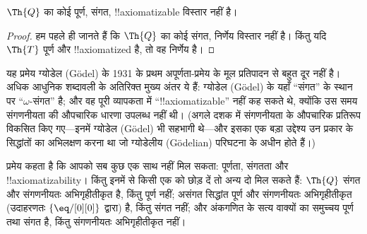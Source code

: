 \documentclass[../../../include/open-logic-section]{subfiles}
\begin{document}


\begin{thm}
$\Th{Q}$ का कोई पूर्ण, संगत, !!{axiomatizable} विस्तार नहीं है।
\end{thm}

\begin{proof}
हम पहले ही जानते हैं कि $\Th{Q}$ का कोई संगत, निर्णेय विस्तार नहीं है।
किंतु यदि $\Th{T}$ पूर्ण और !!{axiomatized} है, तो वह निर्णेय है।
\end{proof}

\begin{explain}
यह प्रमेय ग्योडेल (G\"odel) के 1931 के प्रथम अपूर्णता-प्रमेय के मूल
प्रतिपादन से बहुत दूर नहीं है। अधिक आधुनिक शब्दावली के अतिरिक्त मुख्य
अंतर ये हैं: ग्योडेल (G\"odel) के यहाँ ``संगत'' के स्थान पर ``$\omega$-संगत'' है;
और वह पूरी व्यापकता में ``!!{axiomatizable}'' नहीं कह सकते थे, क्योंकि उस
समय संगणनीयता की औपचारिक धारणा उपलब्ध नहीं थी। (अगले दशक में संगणनीयता के
औपचारिक प्रतिरूप विकसित किए गए---इनमें ग्योडेल (G\"odel) भी सहभागी थे---और इसका एक
बड़ा उद्देश्य उन प्रकार के सिद्धांतों का अभिलक्षण करना था जो ग्योडेलीय (G\"odelian)
परिघटना के अधीन होते हैं।)

प्रमेय कहता है कि आपको सब कुछ एक साथ नहीं मिल सकता: पूर्णता, संगतता और
!!{axiomatizability}। किंतु इनमें से किसी एक को छोड़ दें तो अन्य दो मिल
सकते हैं: $\Th{Q}$ संगत और संगणनीयतः अभिगृहीतीकृत है, किंतु पूर्ण नहीं;
असंगत सिद्धांत पूर्ण और संगणनीयतः अभिगृहीतीकृत (उदाहरणतः
$\{ \eq/[0][0] \}$ द्वारा) है, किंतु संगत नहीं; और अंकगणित के सत्य वाक्यों
का समुच्चय पूर्ण तथा संगत है, किंतु संगणनीयतः अभिगृहीतीकृत नहीं।
\end{explain}
\end{document}
